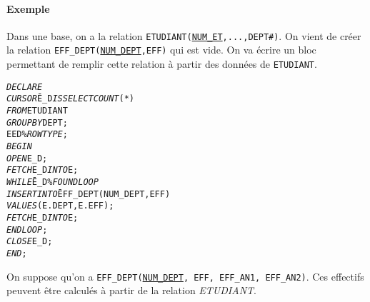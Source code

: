 \documentclass[10pt]{article}
\begin{document}
			\paragraph{Exemple}
				Dans une base, on a la relation \texttt{ETUDIANT(}\underline{\texttt{NUM\_ET}}\texttt{,...,DEPT\#)}. On vient de créer la relation \texttt{EFF\_DEPT(}\underline{\texttt{NUM\_DEPT}}\texttt{,EFF)} qui est vide. On va écrire un bloc permettant de remplir cette relation à partir des données de \texttt{ETUDIANT}.
				
				\begin{alltt}
					\begin{tabbing}
						\emph{DECLARE}\=\\
							\>\emph{CURSOR} \=E_D \emph{IS} \=\emph{SELECT} \=\emph{COUNT}(*)\\
															\>\>\emph{FROM}\>ETUDIANT\\
															\>\>\emph{GROUP BY} DEPT;\\
							\>E\>ED\%\emph{ROWTYPE};\\
						\emph{BEGIN}\\
							\>\emph{OPEN} E_D;\\
							\>\emph{FETCH} E_D \emph{INTO} E;\\
							\>\emph{WHILE} \=E_D\%\emph{FOUND LOOP}\\
								\>\>\emph{INSERT INTO} \= EFF_DEPT(NUM_DEPT,EFF)\\
								\>\>\>\emph{VALUES}(E.DEPT, E.EFF);\\
								\>\>\emph{FETCH} E_D \emph{INTO} E;\\
							\>\emph{END LOOP};\\
							\>\emph{CLOSE} E_D;
						\emph{END};
					\end{tabbing}
				\end{alltt}
				
				On suppose qu'on a \texttt{EFF\_DEPT(}\underline{\texttt{NUM\_DEPT}}\texttt{, EFF, EFF\_AN1, EFF\_AN2)}. Ces effectifs peuvent être calculés à partir de la relation \emph{ETUDIANT}.
				
\end{document}
